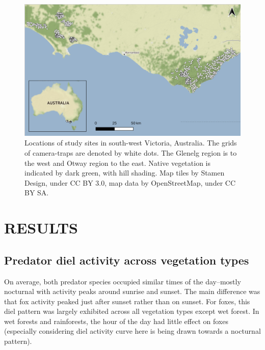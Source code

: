 \documentclass[]{elsarticle} %
\begin{document}
\newpage

\begin{figure}
\includegraphics[width=1\linewidth]{../figs/fig1_map} \caption{Locations of study sites in south-west Victoria, Australia. The grids of camera-traps are denoted by white dots. The Glenelg region is to the west and Otway region to the east. Native vegetation is indicated by dark green, with hill shading. Map tiles by Stamen Design, under CC BY 3.0, map data by OpenStreetMap, under CC BY SA.}\label{fig:map}
\end{figure}

\newpage

\hypertarget{results}{%
\section{RESULTS}\label{results}}

\hypertarget{predator-diel-activity-across-vegetation-types}{%
\subsection{Predator diel activity across vegetation types}\label{predator-diel-activity-across-vegetation-types}}

On average, both predator species occupied similar times of the day--mostly nocturnal with activity peaks around sunrise and sunset. The main difference was that fox activity peaked just after sunset rather than on sunset. For foxes, this diel pattern was largely exhibited across all vegetation types except wet forest. In wet forests and rainforests, the hour of the day had little effect on foxes (especially considering diel activity curve here is being drawn towards a nocturnal pattern).
\end{document}
